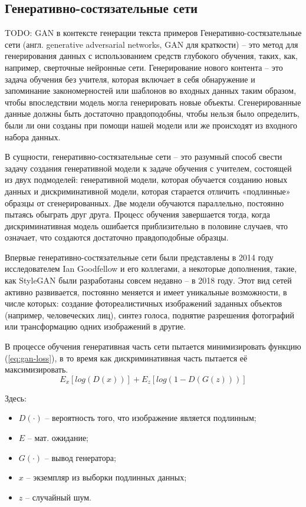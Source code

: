 \subsection{Генеративно-состязательные сети}
{\color{red}TODO: GAN в контексте генерации текста примеров}
Генеративно-состязательные сети (англ. generative adversarial networks, GAN для краткости) -- это метод для генерирования данных с использованием средств глубокого обучения, таких, как, например, сверточные нейронные сети. Генерирование нового контента -- это задача обучения без учителя, которая включает в себя обнаружение и запоминание закономерностей или шаблонов во входных данных таким образом, чтобы впоследствии модель могла генерировать новые объекты. Сгенерированные данные должны быть достаточно правдоподобны, чтобы нельзя было определить, были ли они созданы при помощи нашей модели или же происходят из входного набора данных.

В сущности, генеративно-состязательные сети – это разумный способ свести задачу создания генеративной модели к задаче обучения с учителем, состоящей из двух подмоделей: генеративной модели, которая обучается созданию новых данных и дискриминативной модели, которая старается отличить «подлинные» образцы от сгенерированных. Две модели обучаются параллельно, постоянно пытаясь обыграть друг друга. Процесс обучения завершается тогда, когда дискриминативная модель ошибается приблизительно в половине случаев, что означает, что создаются достаточно правдоподобные образцы.

Впервые генеративно-состязательные сети были представлены в 2014 году исследователем Ian Goodfellow и его коллегами\cite{gan-introduction}, а некоторые дополнения, такие, как StyleGAN были разработаны совсем недавно -- в 2018 году\cite{gan-stylegan}. Этот вид сетей активно развивается, постоянно меняется и имеет уникальные возможности, в числе которых: создание фотореалистичных изображений заданных объектов (например, человеческих лиц), синтез голоса, поднятие разрешения фотографий\cite{gan-upscaling} или трансформацию одних изображений в другие.

В процессе обучения генеративная часть сети пытается минимизировать функцию (\ref{eq:gan-loss}), в то время как дискриминативная часть пытается её максимизировать. 
 \begin{equation}
 	\label{eq:gan-loss}
	E_x[log(D(x))] + E_z[log(1 - D(G(z)))]
 \end{equation}

Здесь:
\begin{itemize}
	\item $D(\cdot)$ -- вероятность того, что изображение является подлинным;
	\item $E$ -- мат. ожидание;
	\item $G(\cdot)$ -- вывод генератора;
	\item $x$ -- экземпляр из выборки подлинных данных;
	\item $z$ -- случайный шум.
\end{itemize}
